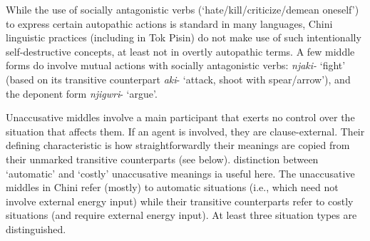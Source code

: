 \documentclass[output=paper]{langscibook}
\begin{document}
While the use of socially antagonistic verbs (‘hate/kill/criticize/demean oneself’) to express certain autopathic actions is standard in many languages, Chini linguistic practices (including in Tok Pisin) do not make use of such intentionally self-destructive concepts, at least not in overtly autopathic terms. A few middle forms do involve mutual actions with socially antagonistic verbs: \textit{njaki-} ‘fight’ (based on its transitive counterpart \textit{aki}- ‘attack, shoot with spear/arrow’), and the deponent form \textit{njigwri}- ‘argue’.

\label{sec:brooks:4.2.1.2}

Unaccusative middles involve a main participant that exerts no control over the situation that affects them. If an agent is involved, they are clause-external. Their defining characteristic is how straightforwardly their meanings are copied from their unmarked transitive counterparts (see  below).  distinction between ‘automatic’ and ‘costly’ unaccusative meanings ia useful here. The unaccusative middles in Chini refer (mostly) to automatic situations (i.e., which need not involve external energy input) while their transitive counterparts refer to costly situations (and require external energy input). At least three situation types are distinguished.
\end{document}
